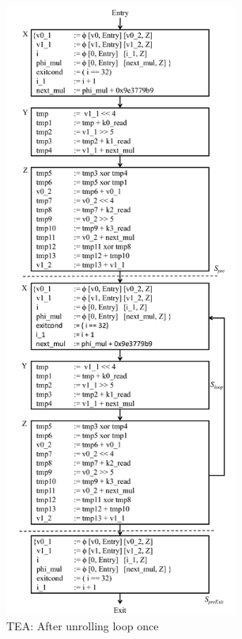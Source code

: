 \begin{figure}[H]
\begin{center}
\includegraphics[height=8in]{fig-proposal/tea-after-two-iterations}
\caption{TEA: After unrolling loop once}
\label{fig:tea-algorithm-two-iterations}
\end{center}
\end{figure}


